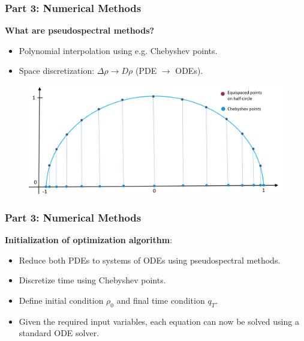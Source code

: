 \documentclass[aspectratio=169,xcolor=dvipsnames]{beamer}
\begin{document}
\begin{frame}
	\frametitle{Part 3: Numerical Methods}
	\textbf{What are pseudospectral methods?}\\
	\begin{itemize}
		\item Polynomial interpolation using e.g. Chebyshev points.
		\item Space discretization: $\Delta \rho \to D \rho$ (PDE $\to$ ODEs).
	\end{itemize}	
	\begin{figure}
		\includegraphics[width=12cm]{chebnodes1.png}\\
	\end{figure}

\end{frame}

\begin{frame}
	\frametitle{Part 3: Numerical Methods}
	\textbf{Initialization of optimization algorithm}:\\
	\vspace{0.3 cm}
    \begin{itemize}
    	\item Reduce both PDEs to systems of ODEs using pseudospectral methods.
    	\item Discretize time using Chebyshev points.
    	\item Define initial condition $\rho_0$ and final time         condition $q_T$.
    	\item Given the required input variables, each equation can now be solved using a standard ODE solver.
    \end{itemize}
	
\end{frame}
\end{document}
